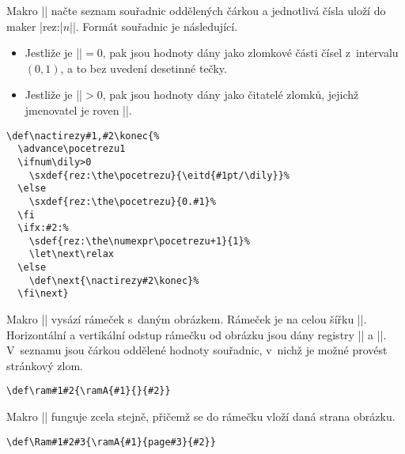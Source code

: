 \documentclass[oldcsbabel]{csbulletin}
\begin{document}
Makro |\nactirezy| načte seznam souřadnic oddělených čárkou a jednotlivá čísla uloží do maker |\csname rez:|$n$|\endcsname|. Formát souřadnic je následující.
\begin{itemize}
\item Jestliže je |\dily|${}=0$, pak jsou hodnoty dány jako zlomkové části čísel z~intervalu~$(0,1)$, a to bez uvedení desetinné tečky.
\item Jestliže je |\dily|${}>0$, pak jsou hodnoty dány jako čitatelé zlomků, jejichž jmenovatel je roven |\dily|.
\end{itemize}


\begin{Verbatim}
\def\nactirezy#1,#2\konec{%
  \advance\pocetrezu1
  \ifnum\dily>0
    \sxdef{rez:\the\pocetrezu}{\eitd{#1pt/\dily}}%
  \else
    \sxdef{rez:\the\pocetrezu}{0.#1}%
  \fi
  \ifx:#2:%
    \sdef{rez:\the\numexpr\pocetrezu+1}{1}%
    \let\next\relax
  \else
    \def\next{\nactirezy#2\konec}%
  \fi\next}
\end{Verbatim}

Makro || vysází rámeček s~daným obrázkem. Rámeček je na celou šířku |\hsize|. Horizontální a vertikální odstup rámečku od obrázku jsou dány registry |\hodstup| a |\vodstup|. V~seznamu jsou čárkou oddělené hodnoty souřadnic, v~nichž je možné provést stránkový zlom.
\begin{Verbatim}
\def\ram#1#2{\ramA{#1}{}{#2}}
\end{Verbatim}
Makro || funguje zcela stejně, přičemž se do rámečku vloží daná strana obrázku.
\begin{Verbatim}
\def\Ram#1#2#3{\ramA{#1}{page#3}{#2}}
\end{Verbatim}
\end{document}
